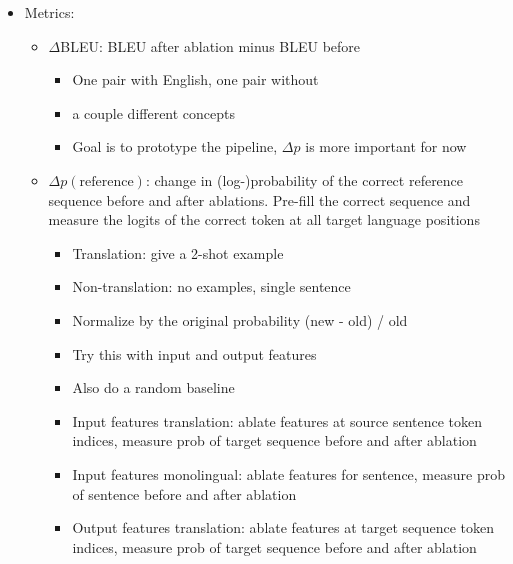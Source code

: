 \documentclass[11pt]{article}
\begin{document}
\begin{itemize}
    [1st] Comparison of input and output features
    \begin{itemize}
        \item Grid of bar charts language x k—
        \item Threshold of indirect effect for output
        \item For each value of k, the y-axis value is \% or number of features in the intersection of input/output features for that language-concept-value
    \end{itemize}
    \item Metrics:
    \begin{itemize}
        \item $\Delta$BLEU: BLEU after ablation minus BLEU before
        \begin{itemize}
            \item One pair with English, one pair without
            \item a couple different concepts
            \item Goal is to prototype the pipeline, $\Delta p$ is more important for now
        \end{itemize}
        \item $\Delta p(\text{reference})$: change in (log-)probability of the correct reference sequence before and after ablations. Pre-fill the correct sequence and measure the logits of the correct token at all target language positions
        \begin{itemize}
            \item Translation: give a 2-shot example
            \item Non-translation: no examples, single sentence
            \item Normalize by the original probability (new - old) / old
            \item Try this with input and output features
            \item Also do a random baseline
            \item Input features translation: ablate features at source sentence token indices, measure prob of target sequence before and after ablation
            \item Input features monolingual: ablate features for sentence, measure prob of sentence before and after ablation
            \item Output features translation: ablate features at target sequence token indices, measure prob of target sequence before and after ablation

\end{itemize}
\end{itemize}
\end{itemize}
\end{document}
